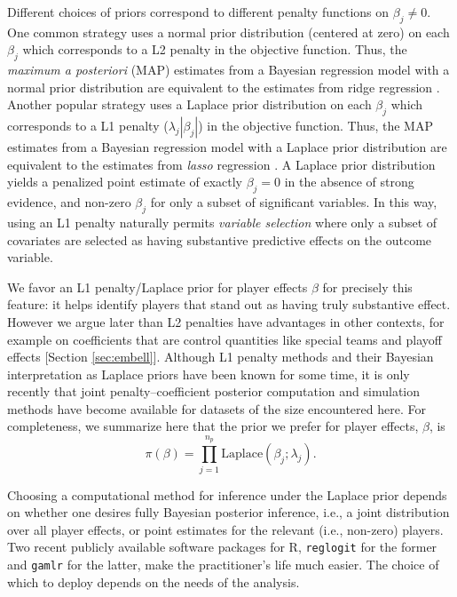 Different choices of priors correspond to different penalty functions on
$\beta_j \ne 0$. One common strategy uses a normal prior distribution
(centered at zero) on each $\beta_j$ which corresponds to a L2 penalty in the
objective function.  Thus, the {\em maximum a posteriori} (MAP) estimates from
a Bayesian regression model with a normal prior distribution are equivalent to
the estimates from ridge regression \cite{HoeKen70}. Another popular strategy
uses a Laplace prior distribution on each $\beta_j$ which corresponds to a L1
penalty ($\lambda_j |\beta_j|$) in the objective function.  Thus, the MAP
estimates from a Bayesian regression model with a Laplace prior distribution
are equivalent to the estimates from {\it lasso} regression \cite{Tib96}.  A
Laplace prior distribution yields a penalized point estimate of exactly
$\beta_j=0$ in the absence of strong evidence, and non-zero $\beta_j$ for only
a subset of significant variables.  In this way, using an L1 penalty naturally
permits {\it variable selection} where only a subset of covariates are
selected as having substantive predictive effects on the outcome variable.
  
We favor an L1 penalty/Laplace prior for player effects $\beta$ for precisely
this feature: it helps identify players that stand out as having truly
substantive effect.  However we argue later than L2 penalties have advantages
in other contexts, for example on coefficients that are control quantities
like special teams and playoff effects [Section \ref{sec:embell}]. Although L1
penalty methods and their Bayesian interpretation as Laplace priors have been
known for some time, it is only recently that joint penalty--coefficient
posterior computation and simulation methods have become available for
datasets of the size encountered here.  For completeness, we summarize here
that the prior we prefer for player effects, $\beta$, is
\begin{equation}
\pi(\beta) = \prod_{j=1}^{n_p} \mathrm{Laplace}(\beta_j; \lambda_j).
\end{equation}

Choosing a computational method for inference under the Laplace prior depends
on whether one desires fully Bayesian posterior inference, i.e., a joint
distribution over all player effects, or point estimates for the relevant
(i.e., non-zero) players.  Two recent publicly available software packages
for {\sf R}, {\tt reglogit} \cite{reglogit} for the former and {\tt gamlr}
\cite{gamlr} for the latter, make the practitioner's life much easier. The
choice of which to deploy depends on the needs of the analysis. 



